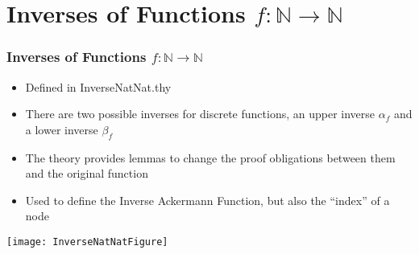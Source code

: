 \section{Inverses of Functions $f: \mathbb{N} \rightarrow \mathbb{N}$}
\begin{frame}
	\frametitle{Inverses of Functions $f: \mathbb{N} \rightarrow \mathbb{N}$}
	\begin{minipage}[t]{0.55\linewidth}
		\vspace{-4cm}
	\begin{itemize}
		\item Defined in InverseNatNat.thy
		\item There are two possible inverses for discrete functions, an upper inverse $\alpha_f$ and a lower inverse $\beta_f$
		\item The theory provides lemmas to change the proof obligations between them and the original function
		\item Used to define the Inverse Ackermann Function, but also the ``index'' of a node
	\end{itemize}
	\end{minipage}
\begin{minipage}[c]{0.4\linewidth}
\texttt{[image: InverseNatNatFigure]}
\end{minipage}
\end{frame}

